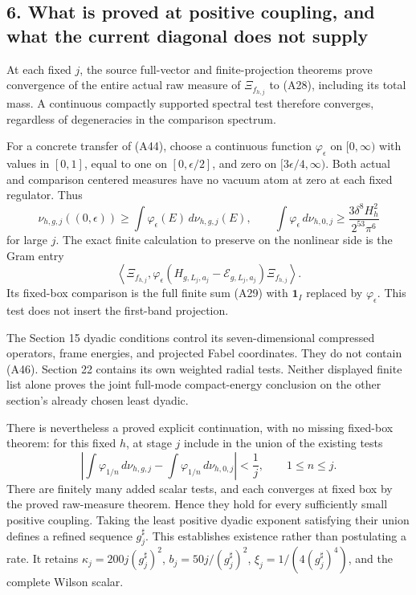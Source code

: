 \documentclass[
  11pt,
]{article}
\begin{document}
\subsection{6. What is proved at positive coupling, and what the current
diagonal does not
supply}\label{weak-coupling-part-10-what-is-proved-at-positive-coupling-and-what-the-current-diagonal-does-not-supply}

At each fixed \(j\), the source full-vector and finite-projection
theorems prove convergence of the entire actual raw measure of
\(\Xi_{f_{h,j}}\) to (A28), including its total mass. A continuous
compactly supported spectral test therefore converges, regardless of
degeneracies in the comparison spectrum.

For a concrete transfer of (A44), choose a continuous function
\(\varphi_\epsilon\) on \([0,\infty)\) with values in \([0,1]\), equal
to one on \([0,\epsilon/2]\), and zero on \([3\epsilon/4,\infty)\). Both
actual and comparison centered measures have no vacuum atom at zero at
each fixed regulator. Thus \[
 \nu_{h,g,j}((0,\epsilon))
 \ge\int\varphi_\epsilon(E)\,d\nu_{h,g,j}(E),\qquad
 \int\varphi_\epsilon\,d\nu_{h,0,j}
 \ge\frac{3\delta^8H_h^2}{2^{53}\pi^6}
\tag{A45}
\] for large \(j\). The exact finite calculation to preserve on the
nonlinear side is the Gram entry \[
 \left\langle\Xi_{f_{h,j}},
       \varphi_\epsilon(H_{g,L_j,a_j}-\mathcal E_{g,L_j,a_j})
                         \Xi_{f_{h,j}}\right\rangle.
\tag{A46}
\] Its fixed-box comparison is the full finite sum (A29) with
\(\mathbf1_I\) replaced by \(\varphi_\epsilon\). This test does not
insert the first-band projection.

The Section 15 dyadic conditions control its seven-dimensional
compressed operators, frame energies, and projected Fabel coordinates.
They do not contain (A46). Section 22 contains its own weighted radial
tests. Neither displayed finite list alone proves the joint full-mode
compact-energy conclusion on the other section's already chosen least
dyadic.

There is nevertheless a proved explicit continuation, with no missing
fixed-box theorem: for this fixed \(h\), at stage \(j\) include in the
union of the existing tests \[
 \left|\int\varphi_{1/n}\,d\nu_{h,g,j}
             -\int\varphi_{1/n}\,d\nu_{h,0,j}\right|<\frac1j,
 \qquad 1\le n\le j.
\tag{A47}
\] There are finitely many added scalar tests, and each converges at
fixed box by the proved raw-measure theorem. Hence they hold for every
sufficiently small positive coupling. Taking the least positive dyadic
exponent satisfying their union defines a refined sequence
\(g_j^{\sharp}\). This establishes existence rather than postulating a
rate. It retains \(\kappa_j=200j(g_j^{\sharp})^2\),
\(b_j=50j/(g_j^{\sharp})^2\), \(\xi_j=1/(4(g_j^{\sharp})^4)\), and the
complete Wilson scalar.
\end{document}
